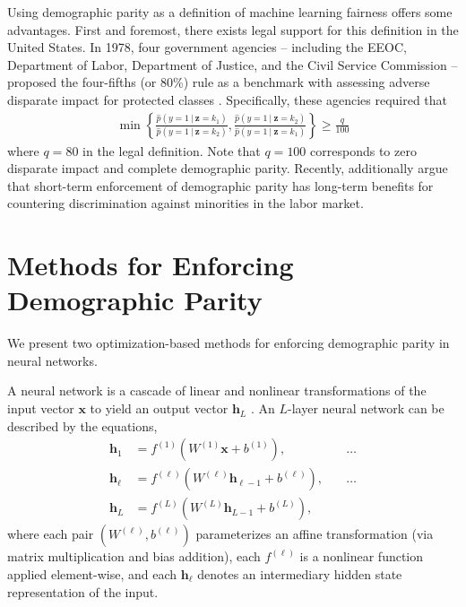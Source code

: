 \documentclass{article}
\newcommand\given[1][]{\:#1\vert\:}
\newcommand{\bd}[1]{\boldsymbol{#1}}
\newcommand{\hp}{\hat{p}}
\newcommand{\idx}[3][]{{#2}^{(#3)}_{#1}}
\begin{document}
Using demographic parity as a definition of machine learning fairness offers some advantages.  First and foremost, there exists legal support for this definition in the United States.  In 1978, four government agencies -- including the EEOC, Department of Labor, Department of Justice, and the Civil Service Commission -- proposed the four-fifths (or 80\%) rule as a benchmark with assessing adverse disparate impact for protected classes \citep{bobko2004four}.  Specifically, these agencies required that
\begin{align}
\min \left\{\frac{\hp(y = 1 \given \bd z = k_1)}{\hp(y = 1 \given \bd z = k_2)}, \frac{\hp(y = 1 \given \bd z = k_2)}{\hp(y = 1 \given \bd z = k_1)} \right\} \geq \frac{q}{100} \label{q-rule}
\end{align} 
where $q = 80$ in the legal definition.  Note that $q = 100$ corresponds to zero disparate impact and complete demographic parity.  Recently, \citet{hu2018short} additionally argue that short-term enforcement of demographic parity has long-term benefits for countering discrimination against minorities in the labor market.  

\section{Methods for Enforcing Demographic Parity}
We present two optimization-based methods for enforcing demographic parity in neural networks.  

A neural network is a cascade of linear and nonlinear transformations of the input vector $\bd x$ to yield an output vector $\bd h_L$ \citep{goodfellow2016deep}.  An $L$-layer neural network can be described by the equations,
\begin{align}
\bd h_1 &= \idx f {1}(\idx W {1} \bd x + \idx b {1}), & \quad \ldots  \label{nn-def} \\
\bd h_\ell &= \idx f {\ell}(\idx W {\ell} \bd h_{\ell - 1} + \idx b {\ell}), & \quad \ldots\nonumber \\
\bd h_L &= \idx f {L}(\idx W {L} \bd h_{L-1} + \idx b {L}), \nonumber
\end{align}  
where each pair $(\idx W \ell, \idx b \ell)$ parameterizes an affine transformation (via matrix multiplication and bias addition), each $\idx f \ell$ is a nonlinear function applied element-wise, and each $\bd h_\ell$ denotes an intermediary hidden state representation of the input.  
\end{document}
